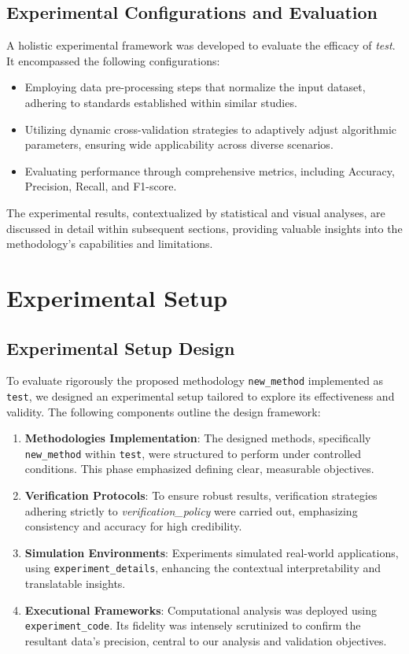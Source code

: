 \documentclass{article} %
\begin{document}
\subsection{Experimental Configurations and Evaluation}

A holistic experimental framework was developed to evaluate the efficacy of \textit{test}. It encompassed the following configurations:
\begin{itemize}
    \item Employing data pre-processing steps that normalize the input dataset, adhering to standards established within similar studies.
    \item Utilizing dynamic cross-validation strategies to adaptively adjust algorithmic parameters, ensuring wide applicability across diverse scenarios.
    \item Evaluating performance through comprehensive metrics, including Accuracy, Precision, Recall, and F1-score.
\end{itemize}

The experimental results, contextualized by statistical and visual analyses, are discussed in detail within subsequent sections, providing valuable insights into the methodology's capabilities and limitations.

\section{Experimental Setup}
\label{sec:experimental}
\subsection{Experimental Setup Design}

To evaluate rigorously the proposed methodology \texttt{new\_method} implemented as \texttt{test}, we designed an experimental setup tailored to explore its effectiveness and validity. The following components outline the design framework:

\begin{enumerate}
    \item \textbf{Methodologies Implementation}: The designed methods, specifically \texttt{new\_method} within \texttt{test}, were structured to perform under controlled conditions. This phase emphasized defining clear, measurable objectives.
    \item \textbf{Verification Protocols}: To ensure robust results, verification strategies adhering strictly to \textit{verification\_policy} were carried out, emphasizing consistency and accuracy for high credibility.
    \item \textbf{Simulation Environments}: Experiments simulated real-world applications, using \texttt{experiment\_details}, enhancing the contextual interpretability and translatable insights.
    \item \textbf{Executional Frameworks}: Computational analysis was deployed using \texttt{experiment\_code}. Its fidelity was intensely scrutinized to confirm the resultant data's precision, central to our analysis and validation objectives.
\end{enumerate}
\end{document}
